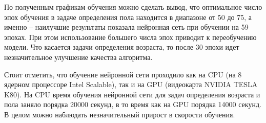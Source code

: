 По полученным графикам обучения можно сделать вывод, что оптимальное число эпох обучения в задаче определения пола находится в диапазоне от 50 до 75, а именно -- наилучшие результаты показала нейронная сеть при обучении на 59 эпохах. При этом использование большего числа эпох приводит к переобучению модели. Что касается задачи определения возраста, то после 30 эпохи идет незначительное улучшение качества алгоритма.

Стоит отметить, что обучение нейронной сети проходило как на CPU (на  8 ядерном процессоре Intel Scalable), так и на GPU (видеокарта NVIDIA TESLA K80). На CPU время обучения нейронной сети для задач определения возраста и пола заняло порядка 20000 секунд, в то время как на GPU  порядка 14000 секунд.   В целом можно наблюдать незначительный прирост в скорости обучения.



\clearpage


